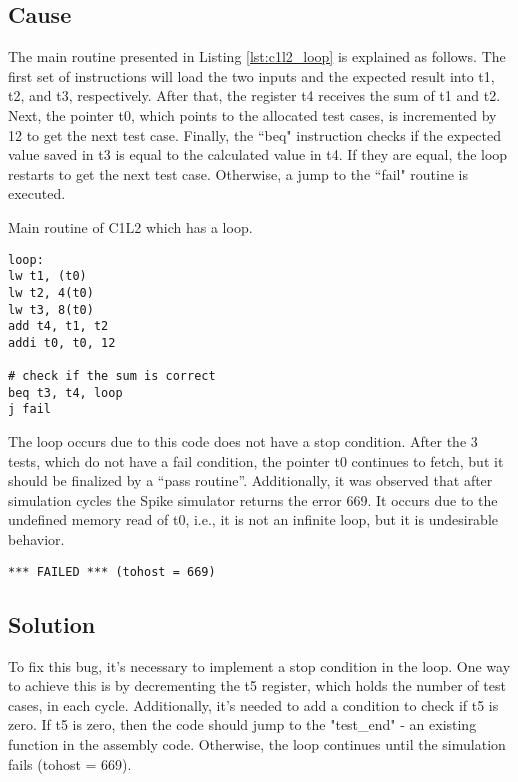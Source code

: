 \subsection{Cause}

The main routine presented in Listing \ref{lst:c1l2_loop} is explained as follows. The first set of instructions will load the two inputs and the expected result into t1, t2, and t3, respectively. After that, the register t4 receives the sum of t1 and t2. Next, the pointer t0, which points to the allocated test cases, is incremented by 12 to get the next test case. Finally, the ``beq" instruction checks if the expected value saved in t3 is equal to the calculated value in t4. If they are equal, the loop restarts to get the next test case. Otherwise, a jump to the ``fail" routine is executed.

\begin{listing}[h]
\caption{Main routine of C1L2 which has a loop.}
\label{lst:c1l2_loop}
\begin{verbatim}
loop:
lw t1, (t0)
lw t2, 4(t0)
lw t3, 8(t0)
add t4, t1, t2
addi t0, t0, 12

# check if the sum is correct
beq t3, t4, loop
j fail
\end{verbatim}
\end{listing}

The loop occurs due to this code does not have a stop condition. After the 3 tests, which do not have a fail condition, the pointer t0 continues to fetch, but it should be finalized by a ``pass routine''. Additionally, it was observed that after simulation cycles the Spike simulator returns the error 669. It occurs due to the undefined memory read of t0, i.e., it is not an infinite loop, but it is undesirable behavior.

\begin{listing}[h]
\begin{verbatim}
*** FAILED *** (tohost = 669)
\end{verbatim}
\end{listing}

\subsection{Solution}

To fix this bug, it's necessary to implement a stop condition in the loop. One way to achieve this is by decrementing the t5 register, which holds the number of test cases, in each cycle. Additionally, it's needed to add a condition to check if t5 is zero. If t5 is zero, then the code should jump to the "test\_end" - an existing function in the assembly code. Otherwise, the loop continues until the simulation fails (tohost = 669).

